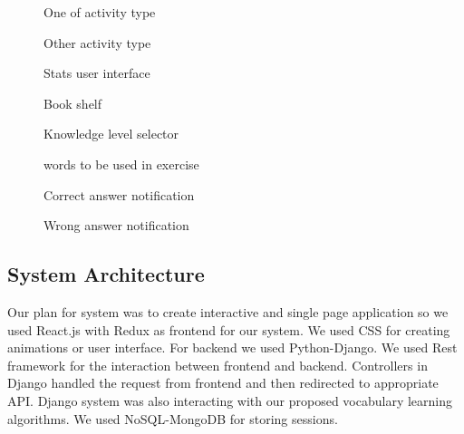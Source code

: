 \documentclass[11pt,a4paper]{article}
\begin{document}
\begin{figure}
\begin{tcbraster}[raster columns=1, enhanced, blankest]
\label{fig:image1}
\caption{One of activity type}

\caption{Other activity type}

\caption{Stats user interface}


\caption{Book shelf}

\end{tcbraster}
\end{figure}



\begin{figure}
\begin{tcbraster}[raster columns=1, enhanced, blankest]
\caption{Knowledge level selector}


\caption{words to be used in exercise}

\caption{Correct answer notification}

\caption{Wrong answer notification}
\end{tcbraster}
\end{figure}




\subsection{System Architecture}
Our plan for system was to create interactive and single page application so we used React.js with Redux as frontend for our system. We used CSS for creating animations or user interface. For backend we used Python-Django. We used Rest framework for the interaction between frontend and backend. Controllers in Django handled the request from frontend and then redirected to appropriate API. Django system was also interacting with our proposed vocabulary learning algorithms. We used NoSQL-MongoDB for storing sessions.   
\end{document}

